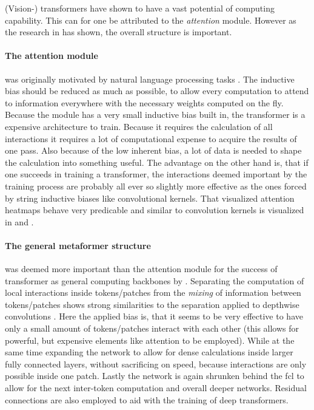 (Vision-) transformers have shown to have a vast potential of computing capability. 
This can for one be attributed to the \emph{attention} module. 
However as the research in \cite{metaformerPaper} has shown, the overall structure is important.

\paragraph{The attention module} was originally motivated by natural language processing tasks \cite{attentionIsAllYouNeed}. The inductive bias should be reduced as much as possible, to allow every computation to attend to information everywhere with the necessary weights computed on the fly.
Because the module has a very small inductive bias built in, the transformer is a expensive architecture to train. 
Because it requires the calculation of all interactions it requires a lot of computational expense to acquire the results of one pass.
Also because of the low inherent bias, a lot of data is needed to shape the calculation into something useful.
The advantage on the other hand is, that if one succeeds in training a transformer, the interactions deemed important by the training process are probably all ever so slightly more effective as the ones forced by string inductive biases like convolutional kernels. That visualized attention heatmaps behave very predicable and similar to convolution kernels is visualized in \cite{dinoPaper} and \cite{imageWorth16x16}.

\paragraph{The general metaformer structure} was deemed more important than the attention module for the success of transformer as general computing backbones by \cite{metaformerPaper}.
Separating the computation of local interactions inside tokens/patches from the \emph{mixing} of information between tokens/patches shows strong similarities to the separation applied to depthwise convolutions \cite{mobileNetPaper}.
Here the applied bias is, that it seems to be very effective to have only a small amount of tokens/patches interact with each other (this allows for powerful, but expensive elements like attention to be employed).
While at the same time expanding the network to allow for dense calculations inside larger fully connected layers, without sacrificing on speed, because interactions are only possible inside one patch.
Lastly the network is again shrunken behind the fcl to allow for the next inter-token computation and overall deeper networks.
Residual connections are also employed to aid with the training of deep transformers.

